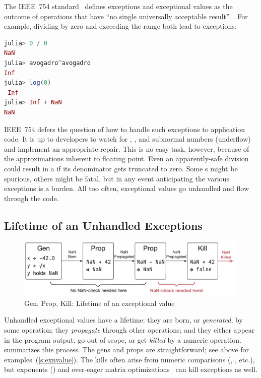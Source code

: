 \documentclass{juliacon}
\begin{document}
The IEEE~754 \fp{} standard~\cite{IEEEStandardBinary1985}
defines exceptions and exceptional values as the outcome of
operations that have ``no single universally acceptable result''~\cite{p-draft-1997}.
For example, dividing by zero and exceeding the  range
both lead to exceptions:

\bigskip

\begin{lstlisting}[language = Julia]
julia> 0 / 0
NaN
julia> avogadro^avogadro
Inf
julia> log(0)
-Inf
julia> Inf + NaN
NaN
\end{lstlisting}

IEEE~754 defers the question of how to handle such exceptions to application code.
It is up to developers to watch for \Nan{}, \Inf{}, and subnormal numbers (underflow)
and implement an appropriate repair.
This is no easy task, however, because of the approximations inherent to
floating point.
Even an apparently-safe division could result in a \Nan{} if its
denominator gets truncated to zero.
Some \Nan{}s might be spurious, others might be fatal, but in any event
anticipating the various exceptions is a burden.
All too often, exceptional values go unhandled and flow through the code.


\subsection{Lifetime of an Unhandled Exceptions}
\label{s:to-kill-a-fp}

\begin{figure}[t]
  \includegraphics[width=\columnwidth]{fig/genpropkill-outline_vector.pdf}
  \caption{Gen, Prop, Kill: Lifetime of an exceptional value}
  \label{f:gpk}
\end{figure}

Unhandled exceptional values have a lifetime: they are born, or \emph{generated}, by some operation; they \emph{propagate} through other operations; and they either appear in the program output, go out of scope, or get \emph{killed} by a numeric operation.
 summarizes this \genpropkill{} process.
The gens and props are straightforward; see above for examples~(\cref{s:exnvalue}).
The kills often arise from numeric comparisons (\code{<}, \code{=}, etc.),
but exponents () and over-eager matrix
optimizations~\cite{ddghlllprr-correctness-2022} can kill exceptions as well.
\end{document}
